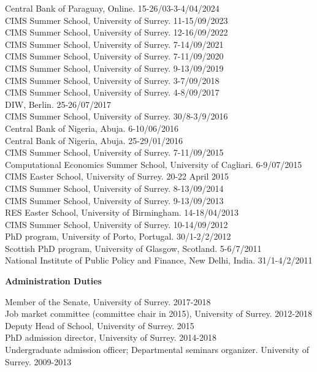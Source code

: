 \documentclass[margin, 11pt]{res} %
\begin{document}
\begin{resume}
Central Bank of Paraguay, Online. \hfill 15-26/03-3-4/04/2024 \\
CIMS Summer School, University of Surrey. \hfill 11-15/09/2023 \\
CIMS Summer School, University of Surrey. \hfill 12-16/09/2022 \\
CIMS Summer School, University of Surrey. \hfill 7-14/09/2021 \\
CIMS Summer School, University of Surrey. \hfill 7-11/09/2020 \\
CIMS Summer School, University of Surrey. \hfill 9-13/09/2019 \\
CIMS Summer School, University of Surrey. \hfill 3-7/09/2018 \\
CIMS Summer School, University of Surrey. \hfill 4-8/09/2017\\
DIW, Berlin. \hfill 25-26/07/2017 \\
CIMS Summer School, University of Surrey. \hfill 30/8-3/9/2016\\
Central Bank of Nigeria, Abuja. \hfill 6-10/06/2016 \\
Central Bank of Nigeria, Abuja. \hfill 25-29/01/2016\\
CIMS Summer School, University of Surrey. \hfill 7-11/09/2015\\
Computational Economics Summer School, University of Cagliari. \hfill 6-9/07/2015\\
CIMS Easter School, University of Surrey. \hfill 20-22 April 2015\\
CIMS Summer School, University of Surrey. \hfill 8-13/09/2014\\
CIMS Summer School, University of Surrey. \hfill 9-13/09/2013\\
RES Easter School, University of Birmingham. \hfill 14-18/04/2013\\
CIMS Summer School, University of Surrey. \hfill 10-14/09/2012 \\
PhD program, University of Porto, Portugal. \hfill 30/1-2/2/2012\\
Scottish PhD program, University of Glasgow, Scotland. \hfill 5-6/7/2011\\
National Institute of Public Policy and Finance, New Delhi, India. \hfill 31/1-4/2/2011


\textbf{Administration Duties}

Member of the Senate, University of Surrey. \hfill 2017-2018\\
Job market committee (committee chair in 2015), University of Surrey. \hfill 2012-2018\\
Deputy Head of School, University of Surrey. \hfill 2015\\
 PhD admission director, University of Surrey. \hfill 2014-2018\\
Undergraduate admission officer; Departmental seminars organizer. University of Surrey. \hfill 2009-2013


\end{resume}
\end{document}
